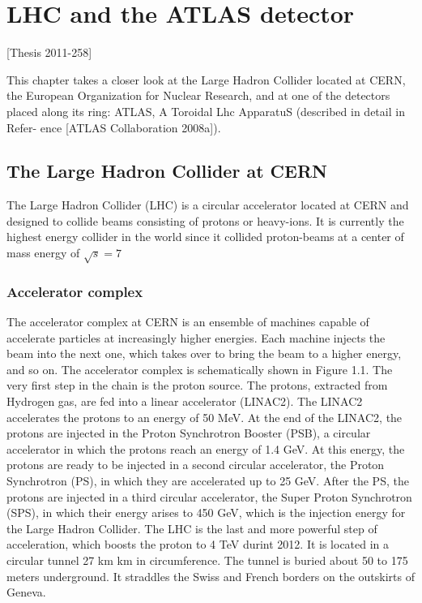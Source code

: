 \chapter{LHC and the ATLAS detector }\label{chap:lhc}

[Thesis 2011-258]

This chapter takes a closer look at the Large Hadron Collider located at CERN,
the European Organization for Nuclear Research, and at one of the detectors placed
along its ring: ATLAS, A Toroidal Lhc ApparatuS (described in detail in Refer-
ence [ATLAS Collaboration 2008a]).



\section{The Large Hadron Collider at CERN}
The Large Hadron Collider (LHC) is a circular accelerator located at CERN and designed
to collide beams consisting of protons or heavy-ions. It is currently the highest energy
collider in the world since it collided proton-beams at a center of mass energy of $\sqrt{s}= 7$

\subsection{Accelerator complex}

The accelerator complex at CERN is an ensemble of machines capable of accelerate particles
at increasingly higher energies. Each machine injects the beam into the next one, which takes over to bring the beam to a higher energy, and so on. The accelerator complex
is schematically shown in Figure 1.1. The very first step in the chain is the proton source. The protons, extracted from Hydrogen gas, are fed into a linear accelerator (LINAC2). The LINAC2 accelerates the protons to an energy of 50 MeV. At the end of the LINAC2, the protons are injected in the Proton Synchrotron Booster (PSB), a circular accelerator in which the protons reach an energy of 1.4 GeV. At this energy, the protons are ready to be injected in a second circular accelerator,
the Proton Synchrotron (PS), in which they are accelerated up to 25 GeV. After the PS, the
protons are injected in a third circular accelerator, the Super Proton Synchrotron (SPS), in
which their energy arises to 450 GeV, which is the injection energy for the Large Hadron
Collider. The LHC is the last and more powerful step of acceleration, which boosts the proton to
4 TeV durint 2012. It is located in a circular tunnel 27 km km in circumference. The tunnel is buried about
50 to 175 meters underground. It straddles the Swiss and French borders on the outskirts
of Geneva.

